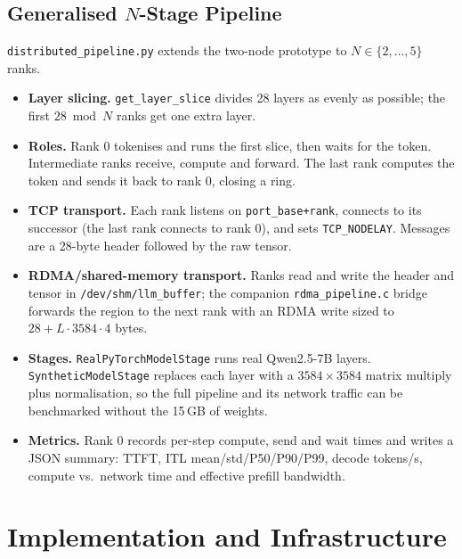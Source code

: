 \documentclass[11pt,a4paper]{article}
\begin{document}
\subsection{Generalised $N$-Stage Pipeline}
\texttt{distributed\_pipeline.py} extends the two-node prototype to $N \in \{2,\dots,5\}$ ranks.
\begin{itemize}[leftmargin=*]
  \item \textbf{Layer slicing.} \texttt{get\_layer\_slice} divides 28 layers as evenly as possible; the first $28 \bmod N$ ranks get one extra layer.
  \item \textbf{Roles.} Rank 0 tokenises and runs the first slice, then waits for the token. Intermediate ranks receive, compute and forward. The last rank computes the token and sends it back to rank 0, closing a ring.
  \item \textbf{TCP transport.} Each rank listens on \texttt{port\_base+rank}, connects to its successor (the last rank connects to rank 0), and sets \texttt{TCP\_NODELAY}. Messages are a 28-byte header followed by the raw tensor.
  \item \textbf{RDMA/shared-memory transport.} Ranks read and write the header and tensor in \texttt{/dev/shm/llm\_buffer}; the companion \texttt{rdma\_pipeline.c} bridge forwards the region to the next rank with an RDMA write sized to $28 + L \cdot 3584 \cdot 4$ bytes.
  \item \textbf{Stages.} \texttt{RealPyTorchModelStage} runs real Qwen2.5-7B layers. \texttt{SyntheticModelStage} replaces each layer with a $3584 \times 3584$ matrix multiply plus normalisation, so the full pipeline and its network traffic can be benchmarked without the 15\,GB of weights.
  \item \textbf{Metrics.} Rank 0 records per-step compute, send and wait times and writes a JSON summary: TTFT, ITL mean/std/P50/P90/P99, decode tokens/s, compute vs.\ network time and effective prefill bandwidth.
\end{itemize}

\section{Implementation and Infrastructure}
\end{document}
